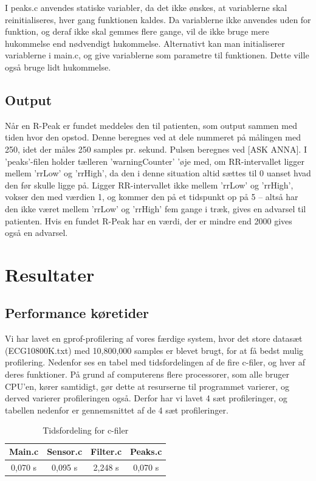 \documentclass{article}
\begin{document}
I peaks.c anvendes statiske variabler, da det ikke ønskes, at variablerne skal reinitialiseres, hver gang funktionen kaldes. Da variablerne ikke anvendes uden for funktion, og deraf ikke skal gemmes flere gange, vil de ikke bruge mere hukommelse end nødvendigt hukommelse. Alternativt kan man initialiserer variablerne i main.c, og give variablerne som parametre til funktionen. Dette ville også bruge lidt hukommelse.

\subsection{Output}
Når en R-Peak er fundet meddeles den til patienten, som output sammen med tiden hvor den opstod. Denne beregnes ved at dele nummeret på målingen med 250, idet der måles 250 samples pr. sekund. Pulsen beregnes ved [ASK ANNA].
I ’peaks’-filen holder tælleren ’warningCounter’ ’øje med, om RR-intervallet ligger mellem ’rrLow’ og ’rrHigh’, da den i denne situation altid sættes til 0 uanset hvad den før skulle ligge på. Ligger RR-intervallet ikke mellem ’rrLow’ og ’rrHigh’, vokser den med værdien 1, og kommer den på et tidspunkt op på 5 – altså har den ikke været mellem ’rrLow’ og ’rrHigh’ fem gange i træk, gives en advarsel til patienten.
Hvis en fundet R-Peak har en værdi, der er mindre end 2000 gives også en advarsel.

\section{Resultater}

\subsection{Performance køretider}
Vi har lavet en gprof-profilering af vores færdige system, hvor det store datasæt (ECG10800K.txt) med 10,800,000 samples er blevet brugt, for at få bedst mulig profilering. 
Nedenfor ses en tabel med tidsfordelingen af de fire c-filer, og hver af deres funktioner.
På grund af computerens flere processorer, som alle bruger CPU’en, kører samtidigt, gør dette at resurserne til programmet varierer, og derved varierer profileringen også. Derfor har vi lavet 4 sæt profileringer, og tabellen nedenfor er gennemsnittet af de 4 sæt profileringer.

\begin{table}[h]
	\centering
	\caption{Tidsfordeling for c-filer}
	\begin{tabular}{|c|c|c|c|}
	\hline
	Main.c & Sensor.c & Filter.c & Peaks.c \\ \hline
	0,070 s & 0,095 s & 2,248 s & 0,070 s \\ \hline
	\end{tabular}
\end{table}
\end{document}
